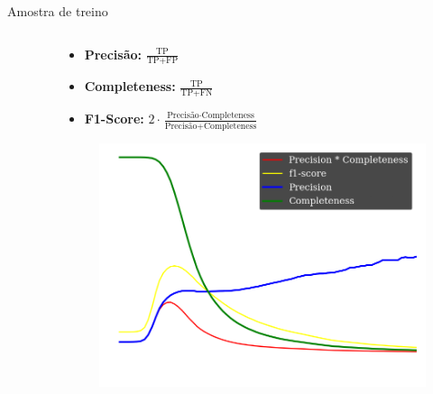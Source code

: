 \begin{frame}[c]{Amostra de treino}
\begin{columns}[c]
\begin{column}{0.48\textwidth}
\begin{figure}
            \end{figure}
        \end{column}
        \begin{column}{0.48\textwidth}
            \footnotesize
            \begin{itemize}
                \item \textbf{Precisão:} $\frac{\text{TP}}{\text{TP} + \text{FP}}$
                \item \textbf{Completeness:} $\frac{\text{TP}}{\text{TP} + \text{FN}}$
                \item \textbf{F1-Score:} $2 \cdot \frac{\text{Precisão} \cdot \text{Completeness}}{\text{Precisão} + \text{Completeness}}$
            \end{itemize}
            \begin{figure}
                \centering
                \includegraphics[width=\linewidth, height=0.5\textheight, keepaspectratio]{images/purity_completeness.png}
            \end{figure}
        \end{column}
    \end{columns}
\end{frame}

